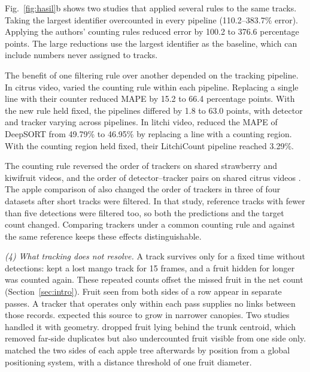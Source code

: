 Fig.~\ref{fig:hasil}b shows two studies that applied several rules to the same tracks. Taking the largest identifier overcounted in every pipeline (110.2--383.7\% error). Applying the authors' counting rules reduced error by 100.2 to 376.6 percentage points. The large reductions use the largest identifier as the baseline, which can include numbers never assigned to tracks.

The benefit of one filtering rule over another depended on the tracking pipeline. In citrus video, \citet{zheng2023efficient} varied the counting rule within each pipeline. Replacing a single line with their counter reduced MAPE by 15.2 to 66.4 percentage points. With the new rule held fixed, the pipelines differed by 1.8 to 63.0 points, with detector and tracker varying across pipelines. In litchi video, \citet{lu2025iot} reduced the MAPE of DeepSORT from 49.79\% to 46.95\% by replacing a line with a counting region. With the counting region held fixed, their LitchiCount pipeline reached 3.29\%.

The counting rule reversed the order of trackers on shared strawberry and kiwifruit videos, and the order of detector--tracker pairs on shared citrus videos \citep{zhou2024advancing,zhang2025row,zheng2023efficient}. The apple comparison of \citet{matos2024tracking} also changed the order of trackers in three of four datasets after short tracks were filtered. In that study, reference tracks with fewer than five detections were filtered too, so both the predictions and the target count changed. Comparing trackers under a common counting rule and against the same reference keeps these effects distinguishable.

\textit{(4) What tracking does not resolve.} A track survives only for a fixed time without detections: \citet{wang2019mango} kept a lost mango track for 15 frames, and a fruit hidden for longer was counted again. These repeated counts offset the missed fruit in the net count (Section~\ref{sec:intro}). Fruit seen from both sides of a row appear in separate passes. A tracker that operates only within each pass supplies no links between those records. \citet{wang2019mango} expected this source to grow in narrower canopies. Two studies handled it with geometry. \citet{liu2019monocular} dropped fruit lying behind the trunk centroid, which removed far-side duplicates but also undercounted fruit visible from one side only. \citet{wei2025multi} matched the two sides of each apple tree afterwards by position from a global positioning system, with a distance threshold of one fruit diameter.

